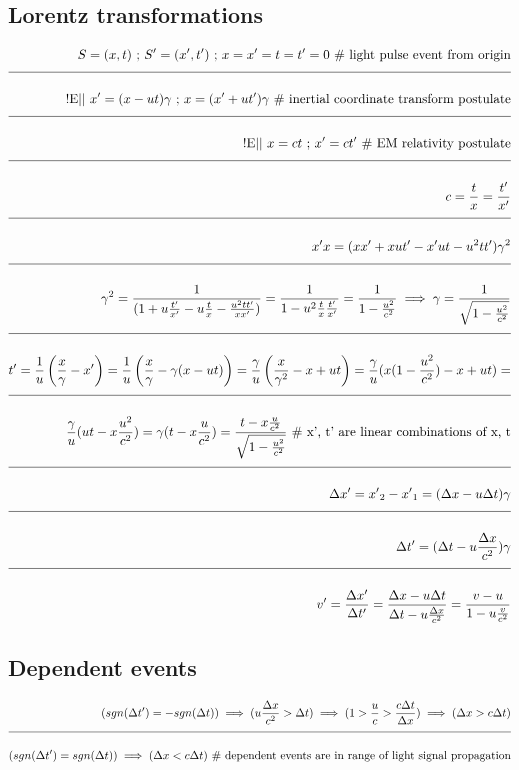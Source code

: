 \documentclass[a4paper]{article}
\newcommand{\eqComment}[1]{\text{  \# #1}}
\newcommand{\eqSep}{\text{ ;  }}
\newcommand{\experimental}{\text{!E||  }}
\newcommand{\sgn}[1]{sgn(#1)}
\newcommand{\n}{\\[1.5ex] \hline \nonumber \\[0ex]}
\begin{document}
\subsection{Lorentz transformations}
\begin{tcolorbox}
\begin{align}
   S = (x, t) \eqSep S^\prime = (x^\prime, t^\prime) \eqSep x = x^\prime = t = t^\prime = 0 \eqComment{light pulse event from origin}
\n \experimental x^\prime = (x - u t) \gamma \eqSep x = (x^\prime + u t^\prime) \gamma \eqComment{inertial coordinate transform postulate}
\n \experimental x = c t \eqSep x^\prime = c t^\prime \eqComment{EM relativity postulate}
\n c = \frac{t}{x} = \frac{t^\prime}{x^\prime}
\n x^\prime x = (x x^\prime + x u t^\prime - x^\prime u t - u^2 t t^\prime) \gamma^2
\n \gamma^2 = \frac{1}{(1 + u \frac{t^\prime}{x^\prime} - u \frac{t}{x} - \frac{u^2 t t^\prime}{x x^\prime})} = \frac{1}{1 - u^2 \frac{t}{x} \frac{t^\prime}{x^\prime}} = \frac{1}{1 - \frac{u^2}{c^2}} \implies \gamma = \frac{1}{\sqrt{1 - \frac{u^2}{c^2}}}
\n t^\prime = \frac{1}{u} \left(\frac{x}{\gamma} - x^\prime\right) = \frac{1}{u} \left(\frac{x}{\gamma} - \gamma(x - u t)\right) = \frac{\gamma}{u} \left(\frac{x}{\gamma^2} - x + u t\right) = \frac{\gamma}{u} (x(1 - \frac{u^2}{c^2}) - x + u t) =
\n \frac{\gamma}{u} (u t - x\frac{u^2}{c^2}) = \gamma (t - x\frac{u}{c^2}) = \frac{t - x\frac{u}{c^2}}{\sqrt{1 - \frac{u^2}{c^2}}} \eqComment{x', t' are linear combinations of x, t}
\n \Delta x^\prime = {x^\prime}_2 - {x^\prime}_1 = (\Delta x - u \Delta t) \gamma
\n \Delta t^\prime = (\Delta t - u \frac{\Delta x}{c^2}) \gamma
\n v^\prime = \frac{\Delta x^\prime}{\Delta t^\prime} = \frac{\Delta x - u \Delta t}{\Delta t - u \frac{\Delta x}{c^2}} = \frac{v - u}{1 - u \frac{v}{c^2}} 
\end{align}
\end{tcolorbox}

\subsection{Dependent events}
\begin{tcolorbox}
\begin{align}
   (\sgn{\Delta t^\prime} = - \sgn{\Delta t}) \implies (u \frac{\Delta x}{c^2} > \Delta t) \implies (1 > \frac{u}{c} > \frac{c \Delta t}{\Delta x}) \implies (\Delta x > c \Delta t)
\n (\sgn{\Delta t^\prime} = \sgn{\Delta t}) \implies (\Delta x < c \Delta t) \eqComment{dependent events are in range of light signal propagation}
\end{align}
\end{tcolorbox}
\end{document}
